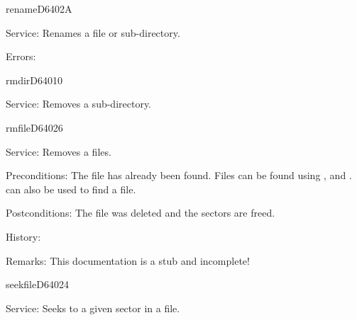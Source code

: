 \newpage
\begin{hyppotrap}{rename}{D640}{2A}
\item [Service:]
  Renames a file or sub-directory.
\item [Errors:]
\notimplemented
\end{hyppotrap}


\begin{hyppotrap}{rmdir}{D640}{10}
\item [Service:]
  Removes a sub-directory.
\notimplemented
\end{hyppotrap}


\begin{hyppotrap}{rmfile}{D640}{26}
\item [Service:]
  Removes a files.
\item [Preconditions:]
  The file has already been found. Files can be found using ,
   and .  can also be
  used to find a file.
\item [Postconditions:]
  The file was deleted and the sectors are freed.
\item [History:]
\item [Remarks:]
  This documentation is a stub and incomplete!
\end{hyppotrap}


\begin{hyppotrap}{seekfile}{D640}{24}
\item [Service:]
  Seeks to a given sector in a file.
\notimplemented
\end{hyppotrap}


